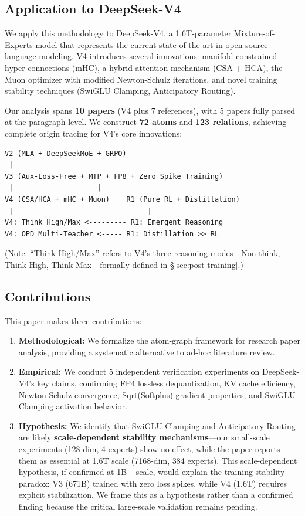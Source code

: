 \documentclass[11pt,a4paper]{article}
\begin{document}
\subsection{Application to DeepSeek-V4}

We apply this methodology to DeepSeek-V4, a 1.6T-parameter Mixture-of-Experts model that represents the current state-of-the-art in open-source language modeling. V4 introduces several innovations: manifold-constrained hyper-connections (mHC), a hybrid attention mechanism (CSA + HCA), the Muon optimizer with modified Newton-Schulz iterations, and novel training stability techniques (SwiGLU Clamping, Anticipatory Routing).

Our analysis spans \textbf{10 papers} (V4 plus 7 references), with 5 papers fully parsed at the paragraph level. We construct \textbf{72 atoms} and \textbf{123 relations}, achieving complete origin tracing for V4's core innovations:

\begin{verbatim}
V2 (MLA + DeepSeekMoE + GRPO)
 |
V3 (Aux-Loss-Free + MTP + FP8 + Zero Spike Training)
 |                    |
V4 (CSA/HCA + mHC + Muon)    R1 (Pure RL + Distillation)
 |                                |
V4: Think High/Max <--------- R1: Emergent Reasoning
V4: OPD Multi-Teacher <----- R1: Distillation >> RL
\end{verbatim}

\noindent(Note: ``Think High/Max'' refers to V4's three reasoning modes---Non-think, Think High, Think Max---formally defined in \S\ref{sec:post-training}.)

\subsection{Contributions}

This paper makes three contributions:

\begin{enumerate}[label=(\arabic*)]
    \item \textbf{Methodological:} We formalize the atom-graph framework for research paper analysis, providing a systematic alternative to ad-hoc literature review.
    
    \item \textbf{Empirical:} We conduct 5 independent verification experiments on DeepSeek-V4's key claims, confirming FP4 lossless dequantization, KV cache efficiency, Newton-Schulz convergence, Sqrt(Softplus) gradient properties, and SwiGLU Clamping activation behavior.
    
    \item \textbf{Hypothesis:} We identify that SwiGLU Clamping and Anticipatory Routing are likely \textbf{scale-dependent stability mechanisms}---our small-scale experiments (128-dim, 4 experts) show no effect, while the paper reports them as essential at 1.6T scale (7168-dim, 384 experts). This scale-dependent hypothesis, if confirmed at 1B+ scale, would explain the training stability paradox: V3 (671B) trained with zero loss spikes, while V4 (1.6T) requires explicit stabilization. We frame this as a hypothesis rather than a confirmed finding because the critical large-scale validation remains pending.
\end{enumerate}
\end{document}
